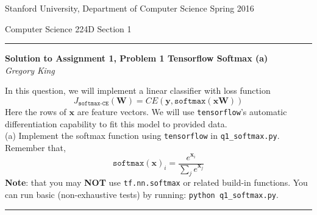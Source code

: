 \documentclass[letter,12pt]{article}
\newcommand{\myheader}[4]
{\vspace*{-0.5in}
\noindent
{#1} \hfill {#3}

\noindent
{#2} \hfill {#4}

\noindent
\rule[8pt]{\textwidth}{1pt}

\vspace{1ex} 
}  %
\newcommand{\myalgsheader}[0]
{\myheader{Stanford University, Department of Computer Science}
{Computer Science 224D}{Spring 2016}{Section 1}}
\newcommand{\myhwtitle}[3]
{\begin{center}
{\large {\bf Solution to Assignment {#1}, Problem {#2}}}\\
\medskip 
{\it {#3}} %
\end{center}}
\begin{document}
\myalgsheader

\pagestyle{plain}
\setcounter{page}{1}
\myhwtitle{1}{1 {\bf Tensorflow Softmax} (a)}{Gregory King}

\bigskip

\noindent In this question, we will implement a linear classifier with loss function
\begin{equation}
J_{\texttt{softmax-CE}}({\textbf{W}}) = CE({\boldsymbol y}, \texttt{softmax}({\boldsymbol x}\textbf{W}))
\end{equation}
Here the rows of ${\boldsymbol x}$ are feature vectors. We will use \texttt{tensorflow}'s automatic
differentiation capability to fit this model to provided data.\\

\noindent (a) Implement the softmax function using \texttt{tensorflow} in \texttt{q1\_softmax.py}. Remember that,
\begin{equation}
\texttt{softmax}({\boldsymbol x})_{i} = \frac{e^{{\boldsymbol x}_{i}}}{\sum_{j} e^{{\boldsymbol x}_j}}
\end{equation}
\textbf{Note}: that you may \textbf{NOT} use \texttt{tf.nn.softmax} or related build-in functions. You can run basic (non-exhaustive tests) by running: \texttt{python q1\_softmax.py}.\\
\vspace{5mm}
\noindent\rule{\textwidth}{0.4pt}\vspace{5mm}
\end{document}
